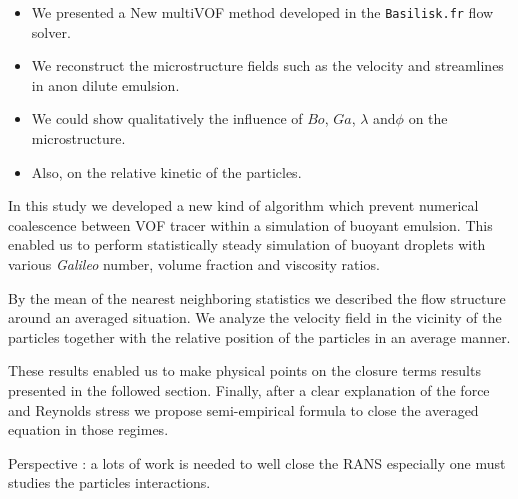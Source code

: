 

\begin{itemize}
    \item We presented a New multiVOF method developed in the \texttt{Basilisk.fr} flow solver. 
    \item We reconstruct the microstructure fields such as the velocity and streamlines in  anon dilute emulsion. 
    \item We could show qualitatively the influence of $Bo$, $Ga$, $\lambda$ and$\phi$ on the microstructure.
    \item Also, on the relative kinetic of the particles.  
\end{itemize}

In this study we developed a new kind of algorithm which prevent numerical coalescence between VOF tracer within a simulation of buoyant emulsion. 
This enabled us to perform statistically steady simulation of buoyant droplets with various \textit{Galileo} number, volume fraction and viscosity ratios. 

By the mean of the nearest neighboring statistics we described the flow structure around an averaged situation. 
We analyze the velocity field in the vicinity of the particles together with the relative position of the particles in an average manner. 

These results enabled us to make physical points on the closure terms results presented in the followed section. 
Finally, after a clear explanation of the force and Reynolds stress we propose semi-empirical formula to close the averaged equation in those regimes. 

Perspective : a lots of work is needed to well close the RANS especially one must studies the particles interactions. 

